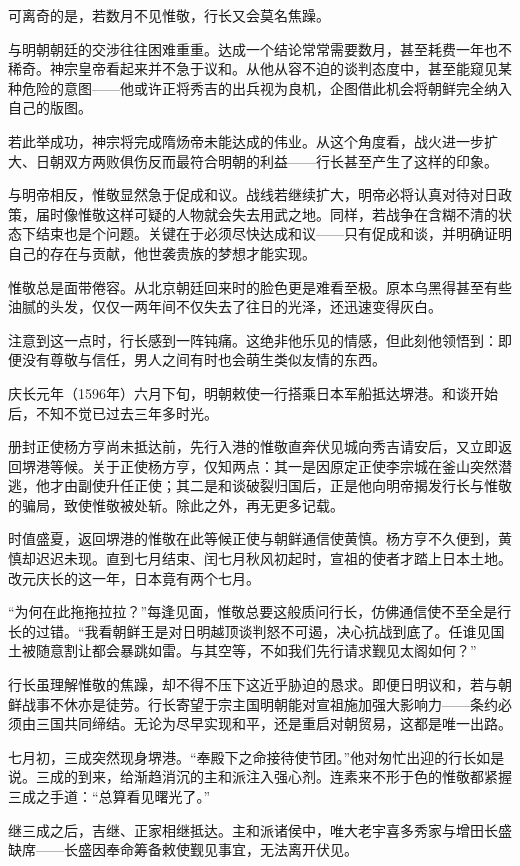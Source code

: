 \documentclass[
]{book}
\begin{document}
可离奇的是，若数月不见惟敬，行长又会莫名焦躁。

与明朝朝廷的交涉往往困难重重。达成一个结论常常需要数月，甚至耗费一年也不稀奇。神宗皇帝看起来并不急于议和。从他从容不迫的谈判态度中，甚至能窥见某种危险的意图------他或许正将秀吉的出兵视为良机，企图借此机会将朝鲜完全纳入自己的版图。

若此举成功，神宗将完成隋炀帝未能达成的伟业。从这个角度看，战火进一步扩大、日朝双方两败俱伤反而最符合明朝的利益------行长甚至产生了这样的印象。

与明帝相反，惟敬显然急于促成和议。战线若继续扩大，明帝必将认真对待对日政策，届时像惟敬这样可疑的人物就会失去用武之地。同样，若战争在含糊不清的状态下结束也是个问题。关键在于必须尽快达成和议------只有促成和谈，并明确证明自己的存在与贡献，他世袭贵族的梦想才能实现。

惟敬总是面带倦容。从北京朝廷回来时的脸色更是难看至极。原本乌黑得甚至有些油腻的头发，仅仅一两年间不仅失去了往日的光泽，还迅速变得灰白。

注意到这一点时，行长感到一阵钝痛。这绝非他乐见的情感，但此刻他领悟到：即便没有尊敬与信任，男人之间有时也会萌生类似友情的东西。

庆长元年（1596年）六月下旬，明朝敕使一行搭乘日本军船抵达堺港。和谈开始后，不知不觉已过去三年多时光。

册封正使杨方亨尚未抵达前，先行入港的惟敬直奔伏见城向秀吉请安后，又立即返回堺港等候。关于正使杨方亨，仅知两点：其一是因原定正使李宗城在釜山突然潜逃，他才由副使升任正使；其二是和谈破裂归国后，正是他向明帝揭发行长与惟敬的骗局，致使惟敬被处斩。除此之外，再无更多记载。

时值盛夏，返回堺港的惟敬在此等候正使与朝鲜通信使黄慎。杨方亨不久便到，黄慎却迟迟未现。直到七月结束、闰七月秋风初起时，宣祖的使者才踏上日本土地。改元庆长的这一年，日本竟有两个七月。

``为何在此拖拖拉拉？''每逢见面，惟敬总要这般质问行长，仿佛通信使不至全是行长的过错。``我看朝鲜王是对日明越顶谈判怒不可遏，决心抗战到底了。任谁见国土被随意割让都会暴跳如雷。与其空等，不如我们先行请求觐见太阁如何？''

行长虽理解惟敬的焦躁，却不得不压下这近乎胁迫的恳求。即便日明议和，若与朝鲜战事不休亦是徒劳。行长寄望于宗主国明朝能对宣祖施加强大影响力------条约必须由三国共同缔结。无论为尽早实现和平，还是重启对朝贸易，这都是唯一出路。

七月初，三成突然现身堺港。``奉殿下之命接待使节团。''他对匆忙出迎的行长如是说。三成的到来，给渐趋消沉的主和派注入强心剂。连素来不形于色的惟敬都紧握三成之手道：``总算看见曙光了。''

继三成之后，吉继、正家相继抵达。主和派诸侯中，唯大老宇喜多秀家与增田长盛缺席------长盛因奉命筹备敕使觐见事宜，无法离开伏见。
\end{document}
